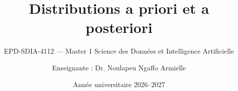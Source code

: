 
\title[Chapitre 2 --- Distributions a priori et a posteriori]{Distributions a priori et a posteriori}
\subtitle{EPD-SDIA-4112 --- Master 1 Science des Données et Intelligence Artificielle}
\author{Enseignante : Dr. Noulapeu Ngaffo Armielle}
\date{Année universitaire 2026--2027}





